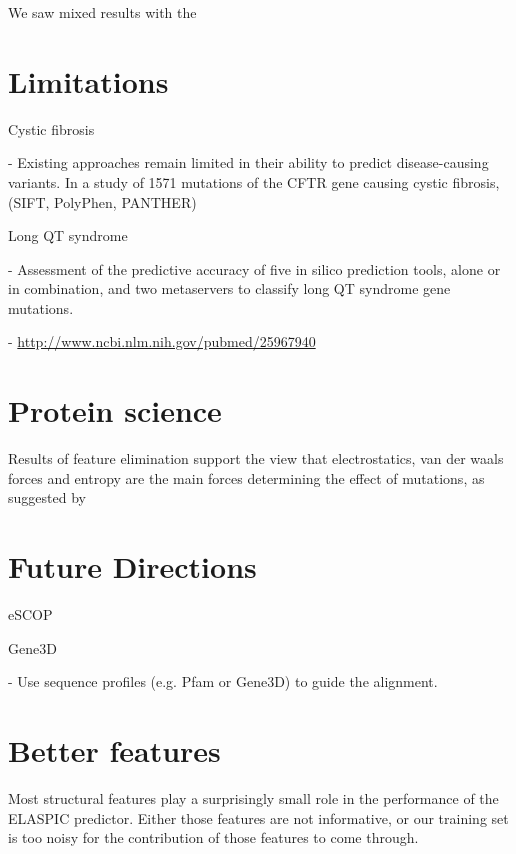
 \label{chap:discussion}

We saw mixed results with the

\section{Limitations}

Cystic fibrosis

  - Existing approaches remain limited in their ability to predict disease-causing variants. In a study of 1571 mutations of the CFTR gene causing cystic fibrosis, (SIFT, PolyPhen, PANTHER) \cite{dorfman_common_2010}

Long QT syndrome

  - Assessment of the predictive accuracy of five in silico prediction tools, alone or in combination, and two metaservers to classify long QT syndrome gene mutations.

  - \url{http://www.ncbi.nlm.nih.gov/pubmed/25967940}


\section{Protein science}

Results of feature elimination support the view that electrostatics, van der waals forces and entropy are the main forces determining the effect of mutations, as suggested by


\section{Future Directions}


eSCOP

Gene3D

- Use sequence profiles (e.g. Pfam or Gene3D) to guide the alignment.


\section{Better features}

Most structural features play a surprisingly small role in the performance of the ELASPIC predictor. Either those features are not informative, or our training set is too noisy for the contribution of those features to come through.


